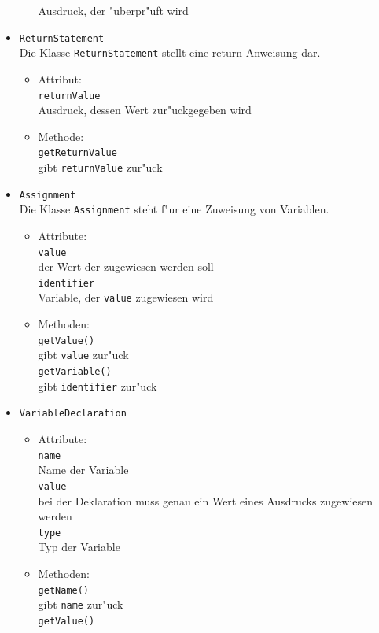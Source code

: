 \documentclass[10pt,a4paper,titlepage]{article}
\begin{document}
\begin{itemize}
\begin{itemize}
Ausdruck, der "uberpr"uft wird
\end{itemize}
\item \texttt{ReturnStatement} \\
Die Klasse \texttt{ReturnStatement} stellt eine return-Anweisung dar. 
\begin{itemize}
\item Attribut: \\
\texttt{returnValue} \\
Ausdruck, dessen Wert zur"uckgegeben wird 
\item Methode: \\
\texttt{getReturnValue} \\
gibt \texttt{returnValue} zur"uck
\end{itemize}
\item \texttt{Assignment} \\
Die Klasse \texttt{Assignment} steht f"ur eine Zuweisung von Variablen.
\begin{itemize}
\item Attribute: \\
\texttt{value} \\
der Wert der zugewiesen werden soll \\
\texttt{identifier} \\
Variable, der \texttt{value} zugewiesen wird
\item Methoden: \\
\texttt{getValue()} \\
gibt \texttt{value} zur"uck \\
\texttt{getVariable()} \\
gibt \texttt{identifier} zur"uck
\end{itemize}
\item \texttt{VariableDeclaration}
\begin{itemize}
\item Attribute: \\
\texttt{name} \\
Name der Variable \\
\texttt{value} \\
bei der Deklaration muss genau ein Wert eines Ausdrucks zugewiesen werden \\
\texttt{type} \\
Typ der Variable 
\item Methoden: \\
\texttt{getName()} \\
gibt \texttt{name} zur"uck \\
\texttt{getValue()} \\

\end{itemize}
\end{itemize}
\end{document}
